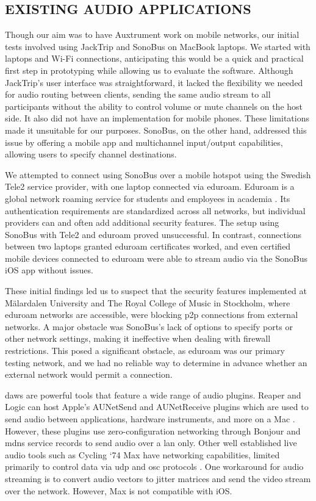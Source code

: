 \documentclass[fleqn]{jaes}
\begin{document}
\subsection{EXISTING AUDIO APPLICATIONS}
Though our aim was to have Auxtrument work on mobile networks, our initial tests involved using JackTrip \cite{noauthor_jack_2024} and SonoBus \cite{noauthor_sonobus_2024} on MacBook laptops. We started with laptops and Wi-Fi connections, anticipating this would be a quick and practical first step in prototyping while allowing us to evaluate the software. Although JackTrip’s user interface was straightforward, it lacked the flexibility we needed for audio routing between clients, sending the same audio stream to all participants without the ability to control volume or mute channels on the host side. It also did not have an implementation for mobile phones. These limitations made it unsuitable for our purposes. SonoBus, on the other hand, addressed this issue by offering a mobile app and multichannel input/output capabilities, allowing users to specify channel destinations.

We attempted to connect using SonoBus over a mobile hotspot using the Swedish Tele2 service provider, with one laptop connected via eduroam. Eduroam is a global network roaming service for students and employees in academia \cite{wierenga_eduroam_2015}. Its authentication requirements are standardized across all networks, but individual providers can and often add additional security features. The setup using SonoBus with Tele2 and eduroam proved unsuccessful. In contrast, connections between two laptops granted eduroam certificates worked, and even certified mobile devices connected to eduroam were able to stream audio via the SonoBus iOS app without issues.

These initial findings led us to suspect that the security features implemented at Mälardalen University and The Royal College of Music in Stockholm, where eduroam networks are accessible, were blocking \gls{p2p} connections from external networks. A major obstacle was SonoBus's lack of options to specify ports or other network settings, making it ineffective when dealing with firewall restrictions. This posed a significant obstacle, as eduroam was our primary testing network, and we had no reliable way to determine in advance whether an external network would permit a connection. 

\Glspl{daw} are powerful tools that feature a wide range of audio plugins. Reaper \cite{noauthor_reaper_nodate} and Logic \cite{noauthor_logic_nodate} can host Apple’s AUNetSend and AUNetReceive plugins which are used to send audio between applications, hardware instruments, and more on a Mac \cite{noauthor_audio_nodate}. However, these plugins use zero-configuration networking through Bonjour \cite{noauthor_bonjour_nodate} and \gls{mdns} service records to send audio over a \gls{lan} only. Other well established live audio tools such as Cycling ‘74 Max have networking capabilities, limited primarily to control data via \gls{udp} and \gls{osc} protocols \cite{amo2014max}. One workaround for audio streaming is to convert audio vectors to jitter matrices and send the video stream over the network. However, Max is not compatible with iOS.
\end{document}
